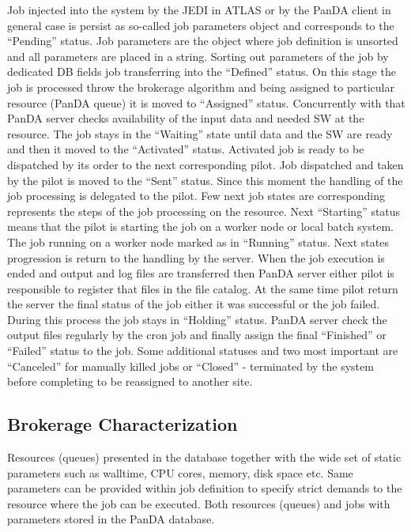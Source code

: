 Job injected into the system by the JEDI in ATLAS or by the PanDA client in
general case is persist as so-called job parameters object and corresponds to
the ``Pending'' status. Job parameters are the object where job definition is
unsorted and all parameters are placed in a string. Sorting out parameters of
the job by dedicated DB fields job transferring into the ``Defined'' status.
On this stage the job is processed throw the brokerage algorithm and being
assigned to particular resource (PanDA queue) it is moved to ``Assigned''
status. Concurrently with that PanDA server checks availability of the input
data and needed SW at the resource. The job stays in the ``Waiting'' state
until data and the SW are ready and then it moved to the ``Activated''
status. Activated job is ready to be dispatched by its order to the next
corresponding pilot. Job dispatched and taken by the pilot is moved to the
``Sent'' status. Since this moment the handling of the job processing is
delegated to the pilot. Few next job states are corresponding represents the
steps of the job processing on the resource. Next ``Starting'' status means
that the pilot is starting the job on a worker node or local batch system.
The job running on a worker node marked as in ``Running'' status. Next states
progression is return to the handling by the server. When the job execution
is ended and output and log files are transferred then PanDA server either
pilot is responsible to register that files in the file catalog. At the same
time pilot return the server the final status of the job either it was
successful or the job failed. During this process the job stays in
``Holding'' status. PanDA server check the output files regularly by the cron
job and finally assign the final ``Finished'' or ``Failed'' status to the
job. Some additional statuses and two most important are ``Canceled'' for
manually killed jobs or ``Closed'' - terminated by the system before
completing to be reassigned to another site.

\subsection{Brokerage Characterization}
\label{subsec:brokerage}

Resources (queues) presented in the database together with the wide set of
static parameters such as walltime, CPU cores, memory, disk space etc. Same
parameters can be provided within job definition to specify strict demands to
the resource where the job can be executed. Both resources (queues) and jobs
with parameters stored in the PanDA database.

